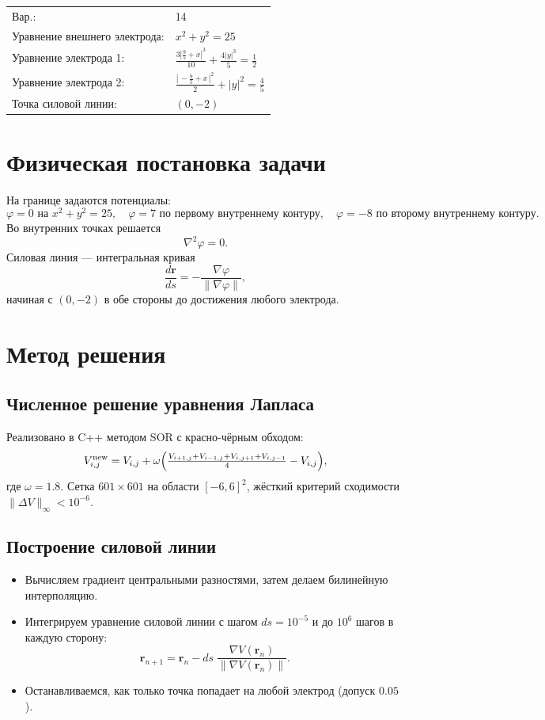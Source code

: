 \documentclass[12pt]{article}
\begin{document}
\begin{center}
\begin{tabular}{|l|l|}
\hline
Вар.: & 14 \\
Уравнение внешнего электрода: & \(x^2 + y^2 = 25\) \\
Уравнение электрода 1: & \(\tfrac{3|\tfrac95 + x|^3}{10} + \tfrac{4|y|^3}{5} = \tfrac12\) \\
Уравнение электрода 2: & \(\tfrac{|\,-\tfrac95 + x\,|^2}{2} + |y|^2 = \tfrac45\) \\
Точка силовой линии: & \((0,-2)\) \\
\hline
\end{tabular}
\end{center}

\section*{Физическая постановка задачи}
На границе задаются потенциалы:
\[
\varphi=0\text{ на }x^2+y^2=25,\quad
\varphi=7\text{ по первому внутреннему контуру},\quad
\varphi=-8\text{ по второму внутреннему контуру}.
\]
Во внутренних точках решается
\[
\nabla^2\varphi=0.
\]
Силовая линия — интегральная кривая
\[
\frac{d\mathbf r}{ds}=-\frac{\nabla\varphi}{\|\nabla\varphi\|},
\]
начиная с \((0,-2)\) в обе стороны до достижения любого электрода.

\section*{Метод решения}
\subsection*{Численное решение уравнения Лапласа}
Реализовано в C++ методом SOR с красно-чёрным обходом:
\[
V_{i,j}^{\text{new}}=V_{i,j}+\omega\Bigl(\tfrac{V_{i+1,j}+V_{i-1,j}+V_{i,j+1}+V_{i,j-1}}{4}-V_{i,j}\Bigr),
\]
где \(\omega=1.8\).  
Сетка \(601\times601\) на области \([-6,6]^2\), жёсткий критерий сходимости \(\|\Delta V\|_\infty<10^{-6}\).

\subsection*{Построение силовой линии}
\begin{itemize}
  \item Вычисляем градиент центра\-льными разностями, затем делаем билинейную интерполяцию.
  \item Интегрируем уравнение силовой линии с шагом \(ds=10^{-5}\) и до \(10^6\) шагов в каждую сторону:
    \[
      \mathbf r_{n+1}=\mathbf r_n - ds\;\frac{\nabla V(\mathbf r_n)}{\|\nabla V(\mathbf r_n)\|}.
    \]
  \item Останавливаемся, как только точка попадает на любой электрод (допуск \(0.05\)).
\end{itemize}
\end{document}
